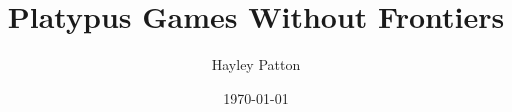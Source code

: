 \documentclass{report}
\begin{document}
\title{Platypus Games Without Frontiers}
\author{Hayley Patton}
\date{\today}
\maketitle

\tableofcontents







\printbibliography
\end{document}
